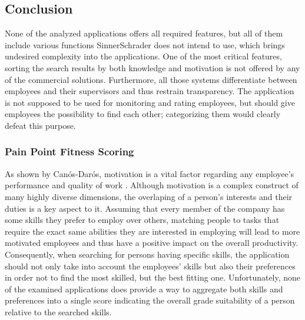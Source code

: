 \newpage

\subsection{Conclusion}
None of the analyzed applications offers all required features, but all of them include various functions SinnerSchrader does not intend to use, which brings undesired complexity into the applications.
One of the most critical features, sorting the search results by both knowledge and motivation is not offered by any of the commercial solutions.
Furthermore, all those systems differentiate between employees and their supervisors and thus restrain transparency. The application is not supposed to be used for monitoring and rating employees, but should give employees the possibility to find each other; categorizing them would clearly defeat this purpose.

\subsubsection{Pain Point Fitness Scoring}
As shown by Canós‐Darós, motivation is a vital factor regarding any employee's performance and quality of work \cite{CanosDaros2013}.
Although motivation is a complex construct of many highly diverse dimensions, the overlaping of a person's interests and their duties is a key aspect to it.
Assuming that every member of the company has some skills they prefer to employ over others, matching people to tasks that require the exact same abilities they are interested in employing will lead to more motivated employees and thus have a positive impact on the overall productivity.
Consequently, when searching for persons having specific skills, the application should not only take into account the employees' skills but also their preferences in order not to find the most skilled, but the best fitting one. Unfortunately, none of the examined applications does provide a way to aggregate both skills and preferences into a single score indicating the overall grade suitability of a person relative to the searched skills.
